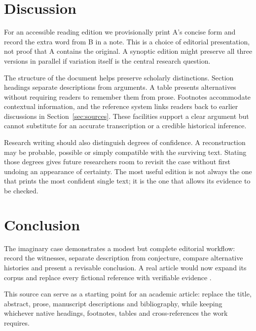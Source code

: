 \documentclass{impeart}
\begin{document}
\section{Discussion}\label{sec:discussion}
For an accessible reading edition we provisionally print A's concise
form and record the extra word from B in a note. This is a choice of
editorial presentation, not proof that A contains the original. A
synoptic edition might preserve all three versions in parallel if
variation itself is the central research question.

The structure of the document helps preserve scholarly distinctions.
Section headings separate descriptions from arguments. A table presents
alternatives without requiring readers to remember them from prose.
Footnotes accommodate contextual information, and the reference system
links readers back to earlier discussions in Section~\ref{sec:sources}.
These facilities support a clear argument but cannot substitute for
an accurate transcription or a credible historical inference.

Research writing should also distinguish degrees of confidence.
A reconstruction may be probable, possible or simply compatible with
the surviving text. Stating those degrees gives future researchers room
to revisit the case without first undoing an appearance of certainty.
The most useful edition is not always the one that prints the most
confident single text; it is the one that allows its evidence to be
checked.

\section{Conclusion}\label{sec:conclusion}
The imaginary case demonstrates a modest but complete editorial
workflow: record the witnesses, separate description from conjecture,
compare alternative histories and present a revisable conclusion.
A real article would now expand its corpus and replace every fictional
reference with verifiable evidence \parencite{sample2026}.

This source can serve as a starting point for an academic article:
replace the title, abstract, prose, manuscript descriptions and
bibliography, while keeping whichever native headings, footnotes,
tables and cross-references the work requires.

\printbibliography
\end{document}
